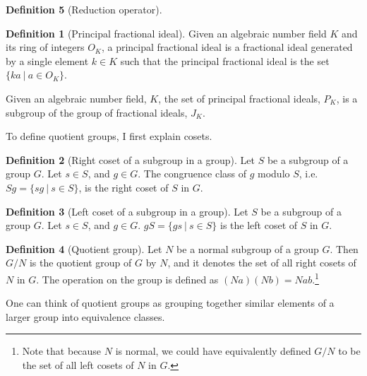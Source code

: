 \documentclass{article}
\theoremstyle{definition}
\newtheorem{definition}{Definition}[section]
\theoremstyle{theorem}
\theoremstyle{example}
\theoremstyle{corollary}
\begin{document}
\begin{definition}[Reduction operator]
\bigskip

\theoremstyle{definition}
\begin{definition}[Principal fractional ideal]
Given an algebraic number field \(K\) and its ring of integers \(O_{K}\), a principal fractional ideal is a fractional ideal generated by a single element \(k \in K\) such that the principal fractional ideal is the set \(\{k a \ | \ a \in O_{K} \} \).
\end{definition}

\bigskip

Given an algebraic number field, \(K\), the set of principal fractional ideals, \(P_{K}\), is a subgroup of the group of fractional ideals, \(J_{K}\).

\bigskip

To define quotient groups, I first explain cosets.

\bigskip

\theoremstyle{definition}
\begin{definition}[Right coset of a subgroup in a group]
Let \(S\) be a subgroup of a group \(G\). Let \(s \in S\), and \(g \in G\). The congruence class of \(g\) modulo \(S\), i.e. \(Sg = \{ sg \ | \ s \in S\}\), is the right coset of \(S\) in \(G\).
\end{definition}

\bigskip

\theoremstyle{definition}
\begin{definition}[Left coset of a subgroup in a group]
Let \(S\) be a subgroup of a group \(G\). Let \(s \in S\), and \(g \in G\). \(gS = \{ gs \ | \ s \in S\}\) is the left coset of \(S\) in \(G\).
\end{definition}

\bigskip

\theoremstyle{definition}
\begin{definition}[Quotient group]
Let \(N\) be a normal subgroup of a group \(G\). Then \(G/N\) is the quotient group of \(G\) by \(N\), and it denotes the set of all right cosets of \(N\) in \(G\). The operation on the group is defined as \((Na)(Nb) = Nab\).\footnote{Note that because \(N\) is normal, we could have equivalently defined \(G/N\) to be the set of all left cosets of \(N\) in \(G\).}
\end{definition}

\bigskip

One can think of quotient groups as grouping together similar elements of a larger group into equivalence classes.

\bigskip


\end{definition}
\end{document}
